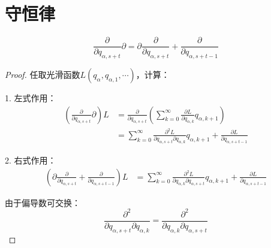 \documentclass[12pt, a4paper, oneside, UTF8]{ctexbook}  %
\begin{document}
\section{守恒律}








\begin{lemma}
    \begin{equation}
        \frac{\partial}{\partial q_{\alpha,s+t}}\partial 
        = \partial\frac{\partial}{\partial q_{\alpha,s+t}} 
        + \frac{\partial}{\partial q_{\alpha,s+t-1}}
    \end{equation}
    \begin{proof}
        任取光滑函数$L(q_\alpha,q_{\alpha,1},\cdots)$，计算：
        
        1. 左式作用：
        \begin{align*}
        \left(\frac{\partial}{\partial q_{\alpha,s+t}}\partial\right)L 
        &= \frac{\partial}{\partial q_{\alpha,s+t}}\left(\sum_{k=0}^\infty \frac{\partial L}{\partial q_{\alpha,k}}q_{\alpha,k+1}\right) \\
        &= \sum_{k=0}^\infty \frac{\partial^2 L}{\partial q_{\alpha,s+t}\partial q_{\alpha,k}}q_{\alpha,k+1} 
        + \frac{\partial L}{\partial q_{\alpha,s+t-1}}
        \end{align*}
        
        2. 右式作用：
        \begin{align*}
        \left(\partial\frac{\partial}{\partial q_{\alpha,s+t}} 
        + \frac{\partial}{\partial q_{\alpha,s+t-1}}\right)L 
        &= \sum_{k=0}^\infty \frac{\partial^2 L}{\partial q_{\alpha,k}\partial q_{\alpha,s+t}}q_{\alpha,k+1} 
        + \frac{\partial L}{\partial q_{\alpha,s+t-1}}
        \end{align*}
        
        由于偏导数可交换：
        \[
        \frac{\partial^2}{\partial q_{\alpha,s+t}\partial q_{\alpha,k}}
        = \frac{\partial^2}{\partial q_{\alpha,k}\partial q_{\alpha,s+t}}
        \]
    \end{proof} 
\end{lemma}   





\ifx\allfiles\undefined
\end{document}
